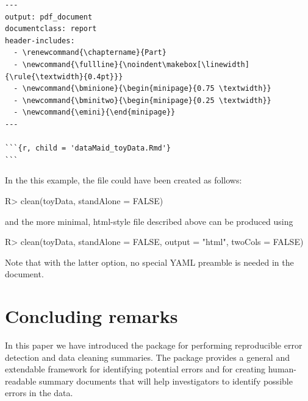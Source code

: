 \documentclass[article,shortnames]{jss}
\newcommand{\hl}[1]{\textcolor{magenta}{#1}}
\begin{document}
{\small
\begin{Verbatim}
---
output: pdf_document
documentclass: report
header-includes:
  - \renewcommand{\chaptername}{Part}
  - \newcommand{\fullline}{\noindent\makebox[\linewidth]{\rule{\textwidth}{0.4pt}}}
  - \newcommand{\bminione}{\begin{minipage}{0.75 \textwidth}}
  - \newcommand{\bminitwo}{\begin{minipage}{0.25 \textwidth}}
  - \newcommand{\emini}{\end{minipage}}
---

```{r, child = 'dataMaid_toyData.Rmd'}
```
\end{Verbatim}
}

In the this example, the  file could have
been created as follows:

\begin{Schunk}
\begin{Sinput}
R> clean(toyData, standAlone = FALSE)
\end{Sinput}
\end{Schunk}

and the more minimal, html-style  file described above can be produced using

\begin{Schunk}
\begin{Sinput}
R> clean(toyData, standAlone = FALSE, output = "html", twoCols = FALSE)
\end{Sinput}
\end{Schunk}

Note that with the latter option, no special YAML preamble is needed in the  document.



\section{Concluding remarks}
\label{conclusion}

In this paper we have introduced the  package 
for performing reproducible error detection and data cleaning
summaries. The package provides a general and extendable framework for
identifying potential errors and for creating human-readable summary
documents that will help investigators to identify possible errors in
the data.
\end{document}
